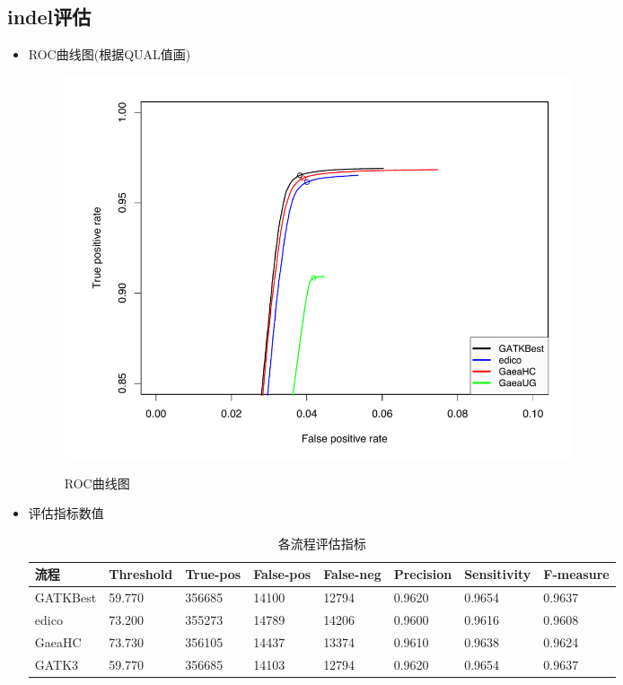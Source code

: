 \documentclass[UTF8,10pt,a4paper]{ctexart}
\begin{document}
\subsection{indel评估}
\begin{itemize}
\item ROC曲线图(根据QUAL值画)\\
\begin{figure}[htbp]
\begin{center}
\label{indel}
\includegraphics[width=15cm]{indel.pdf}
\caption{ROC曲线图}
\end{center}
\end{figure}
\item 评估指标数值\\
\begin{table}[htp]
\newcommand{\tabincell}[2]{\begin{tabular}{@{}#1@{}}#2\end{tabular}}
{\small
\caption{各流程评估指标}
\begin{center}
\begin{tabular}{p{1.5cm}|p{1.5cm}|p{1.5cm}|p{1.5cm}|p{1.5cm}|p{1.5cm}|p{1.5cm}|p{1.7cm}}
\hline
流程 & Threshold & True-pos & False-pos & False-neg & Precision & Sensitivity & F-measure\\
\hline
GATKBest & 59.770 & 356685 & 14100 & 12794 & 0.9620 & 0.9654 & 0.9637 \\
edico & 73.200 & 355273 & 14789 & 14206 & 0.9600 & 0.9616 & 0.9608 \\
GaeaHC & 73.730 & 356105 & 14437 & 13374 & 0.9610 & 0.9638 & 0.9624 \\
GATK3 & 59.770 & 356685 & 14103 & 12794 & 0.9620 & 0.9654  & 0.9637\\

\end{tabular}
\end{center}}
\end{table}
\end{itemize}
\end{document}
